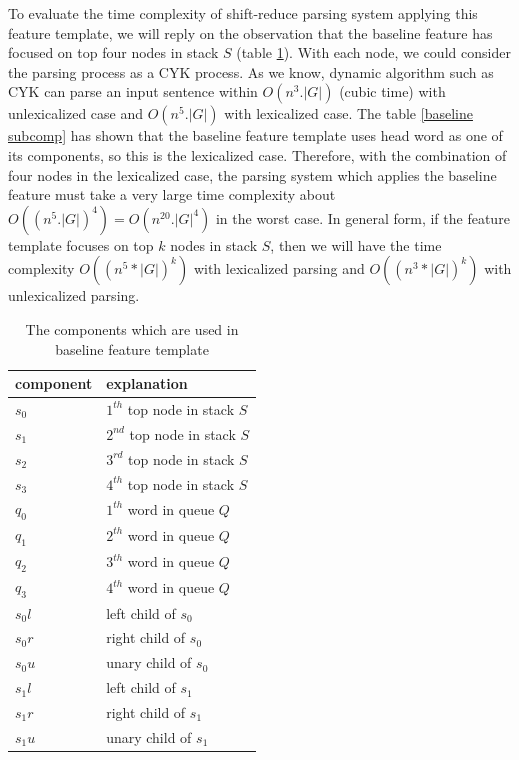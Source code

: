 To evaluate the time complexity of shift-reduce parsing system applying this feature template, we will reply on the observation that the baseline feature has focused on top four nodes in stack $S$ (table \ref{baseline comp}). With each node, we could consider the parsing process as a CYK process. As we know, dynamic algorithm such as CYK can parse an input sentence within $O(n^3.|G|)$ (cubic time) with unlexicalized case and $O(n^5.|G|)$ with lexicalized case. The table \ref{baseline subcomp} has shown that the baseline feature template uses head word as one of its components, so this is the lexicalized case. Therefore, with the combination of four nodes in the lexicalized case, the parsing system which applies the baseline feature must take a very large time complexity about $O((n^5.|G|)^4)=O(n^{20}.|G|^4)$ in the worst case. In general form, if the feature template focuses on top $k$ nodes in stack $S$, then we will have the time complexity $O((n^5*|G|)^k)$ with lexicalized parsing and $O((n^3*|G|)^k)$ with unlexicalized parsing.

\begin{table}[h!]
	\caption{\label{baseline comp} The components which are used in baseline feature template}
	\begin{center}
		\begin{tabular}{|l|l|}
			\hline 
			component & explanation  \\ 
			\hline
			$s_0$ & $1^{th}$ top node in stack $S$ \\
			$s_1$ & $2^{nd}$ top node in stack $S$ \\
			$s_2$ & $3^{rd}$ top node in stack $S$ \\
			$s_3$ & $4^{th}$ top node in stack $S$ \\
			\hline
			$q_0$ & $1^{th}$ word in queue $Q$ \\
			$q_1$ & $2^{th}$ word in queue $Q$ \\
			$q_2$ & $3^{th}$ word in queue $Q$ \\
			$q_3$ & $4^{th}$ word in queue $Q$ \\
			\hline
			$s_0l$ & left child of $s_0$ \\
			$s_0r$ & right child of $s_0$ \\
			$s_0u$ & unary child of $s_0$ \\
			\hline
			$s_1l$ & left child of $s_1$ \\
			$s_1r$ & right child of $s_1$ \\
			$s_1u$ & unary child of $s_1$ \\
			\hline
		\end{tabular}
	\end{center}
\end{table}

